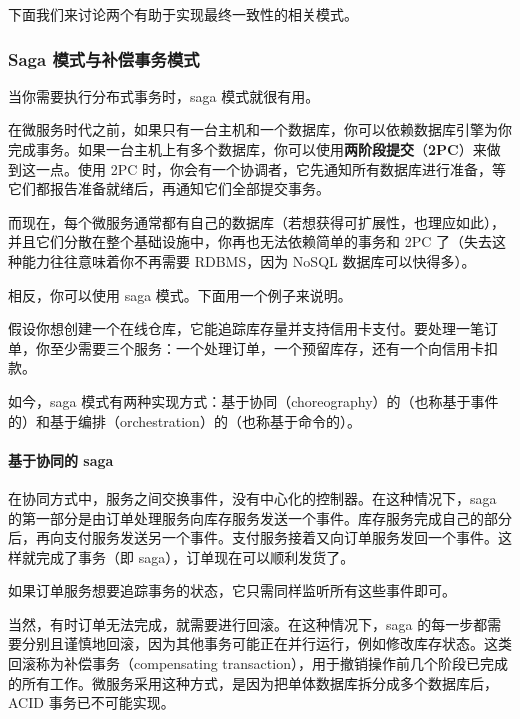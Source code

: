 下面我们来讨论两个有助于实现最终一致性的相关模式。

\subsubsection{Saga 模式与补偿事务模式}

当你需要执行分布式事务时，saga 模式就很有用。

\label{idx:300}
在微服务时代之前，如果只有一台主机和一个数据库，你可以依赖数据库引擎为你完成事务。如果一台主机上有多个数据库，你可以使用\textbf{两阶段提交}（\textbf{2PC}）来做到这一点。使用 2PC 时，你会有一个协调者，它先通知所有数据库进行准备，等它们都报告准备就绪后，再通知它们全部提交事务。

而现在，每个微服务通常都有自己的数据库（若想获得可扩展性，也理应如此），并且它们分散在整个基础设施中，你再也无法依赖简单的事务和 2PC 了（失去这种能力往往意味着你不再需要 RDBMS，因为 NoSQL 数据库可以快得多）。

相反，你可以使用 saga 模式。下面用一个例子来说明。

假设你想创建一个在线仓库，它能追踪库存量并支持信用卡支付。要处理一笔订单，你至少需要三个服务：一个处理订单，一个预留库存，还有一个向信用卡扣款。

\label{idx:301}
\label{idx:302}
\label{idx:303}
\label{idx:304}
如今，saga 模式有两种实现方式：基于协同（choreography）的（也称基于事件的）和基于编排（orchestration）的（也称基于命令的）。

\paragraph{基于协同的 saga}

\label{idx:305}
在协同方式中，服务之间交换事件，没有中心化的控制器。在这种情况下，saga 的第一部分是由订单处理服务向库存服务发送一个事件。库存服务完成自己的部分后，再向支付服务发送另一个事件。支付服务接着又向订单服务发回一个事件。这样就完成了事务（即 saga），订单现在可以顺利发货了。

如果订单服务想要追踪事务的状态，它只需同样监听所有这些事件即可。

当然，有时订单无法完成，就需要进行回滚。在这种情况下，saga 的每一步都需要分别且谨慎地回滚，因为其他事务可能正在并行运行，例如修改库存状态。这类回滚称为补偿事务（compensating transaction），用于撤销操作前几个阶段已完成的所有工作。微服务采用这种方式，是因为把单体数据库拆分成多个数据库后，ACID 事务已不可能实现。


